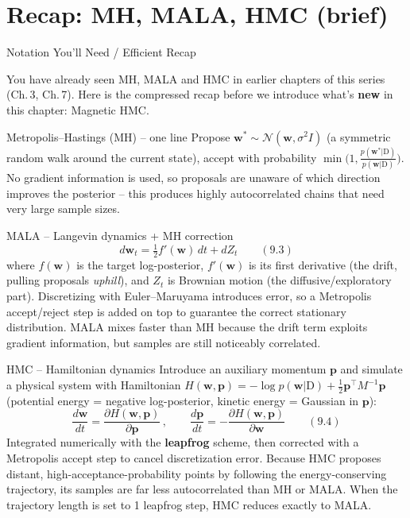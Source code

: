 \documentclass[aspectratio=169,10pt]{beamer}
\newcommand{\vw}{\mathbf{w}}
\newcommand{\vp}{\mathbf{p}}
\begin{document}
\section{Recap: MH, MALA, HMC (brief)}

\begin{frame}[allowframebreaks]{Notation You'll Need / Efficient Recap}

You have already seen MH, MALA and HMC in earlier chapters of this series
(Ch.\,3, Ch.\,7). Here is the compressed recap before we introduce what's
\textbf{new} in this chapter: Magnetic HMC.

\begin{block}{Metropolis--Hastings (MH) -- one line}
Propose $\vw^\ast \sim \mathcal{N}(\vw, \sigma^2 I)$ (a symmetric random
walk around the current state), accept with probability
$\min\!\big(1, \tfrac{p(\vw^\ast|\mathrm D)}{p(\vw|\mathrm D)}\big)$. No
gradient information is used, so proposals are unaware of which direction
improves the posterior -- this produces highly autocorrelated chains that
need very large sample sizes.
\end{block}

\begin{block}{MALA -- Langevin dynamics + MH correction}
$$ d\vw_t = \tfrac{1}{2} f'(\vw) \, dt + dZ_t \qquad (9.3)$$
where $f(\vw)$ is the target log-posterior, $f'(\vw)$ is its first
derivative (the drift, pulling proposals \emph{uphill}), and $Z_t$ is
Brownian motion (the diffusive/exploratory part). Discretizing with
Euler--Maruyama introduces error, so a Metropolis accept/reject step is
added on top to guarantee the correct stationary distribution. MALA mixes
faster than MH because the drift term exploits gradient information, but
samples are still noticeably correlated.

\framebreak
\end{block}

\begin{block}{HMC -- Hamiltonian dynamics}
Introduce an auxiliary momentum $\vp$ and simulate a physical system with
Hamiltonian $H(\vw,\vp) = -\log p(\vw|\mathrm D) + \tfrac12\vp^{\!\top} M^{-1}\vp$
(potential energy = negative log-posterior, kinetic energy = Gaussian in
$\vp$):
$$ \frac{d\vw}{dt} = \frac{\partial H(\vw,\vp)}{\partial \vp}\,, \qquad
   \frac{d\vp}{dt} = -\frac{\partial H(\vw,\vp)}{\partial \vw} \qquad (9.4)$$
Integrated numerically with the \textbf{leapfrog} scheme, then corrected
with a Metropolis accept step to cancel discretization error. Because HMC
proposes distant, high-acceptance-probability points by following the
energy-conserving trajectory, its samples are far less autocorrelated than
MH or MALA. When the trajectory length is set to 1 leapfrog step, HMC
reduces exactly to MALA.
\end{block}


\end{frame}
\end{document}
